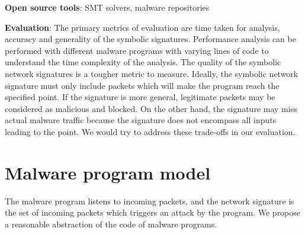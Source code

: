 \documentclass[]{article}
\begin{document}
\noindent\textbf{Open source tools}: SMT solvers, malware repositories

\noindent\textbf{Evaluation}: 
The primary metrics of evaluation are time taken for analysis, accuracy and 
generality of the symbolic signatures. Performance analysis can be performed 
with different malware programs with varying lines of code to understand
the time complexity of the analysis. The quality of the symbolic network
signatures is a tougher metric to measure. Ideally, the symbolic network 
signature must only include packets which will make the program reach the
specified point. If the signature is more general, legitimate packets may 
be considered as malicious and blocked. On the other hand, the signature
may miss actual malware traffic because the signature does not encompass
all inputs leading to the point. We would try to address these trade-offs in
our evaluation.

\appendix
\section{Malware program model} \label{sec:malwaremodel}
The malware program listens to incoming packets, and the
network signature is the set of incoming packets which triggers
an attack by the program. We propose a reasonable abstraction
of the code of malware programs. 
\end{document}

